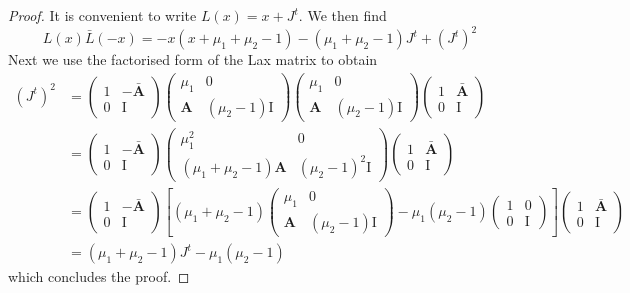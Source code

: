 \documentclass[11pt]{article}
\numberwithin{equation}{section}
\newcommand{\OA}{\mathbf{A}}
\newcommand{\OAD}{\mathbf{\bar{A}}}
\newcommand{\ID}{\mathrm{I}}
\begin{document}
\begin{proof} It is convenient to write $L(x)=x+J^t$. We then find
\begin{equation}
    L(x)\bar L(-x)=-x(x+\mu_1+\mu_2-1)-(\mu_1+\mu_2-1)J^t+(J^t)^2
\end{equation}
Next we use the factorised form of the Lax matrix to obtain
\begin{equation}
\begin{split}
		(J^t)^2&=\left(\begin{array}{cc}
			1&-\OAD\\
			0&\ID
		\end{array}\right)\left(\begin{array}{cc}
			\mu_1&0\\
			\OA&(\mu_2-1)\ID
		\end{array}\right)\left(\begin{array}{cc}
			\mu_1&0\\
			\OA&(\mu_2-1)\ID
		\end{array}\right)\left(\begin{array}{cc}
			1&\OAD\\
			0&\ID
		\end{array}\right)\\
        &=\left(\begin{array}{cc}
			1&-\OAD\\
			0&\ID
		\end{array}\right)\left(\begin{array}{cc}
			\mu_1^2&0\\
			(\mu_1+\mu_2-1)\OA&(\mu_2-1)^2\ID
		\end{array}\right)\left(\begin{array}{cc}
			1&\OAD\\
			0&\ID
		\end{array}\right)\\
        &=\left(\begin{array}{cc}
			1&-\OAD\\
			0&\ID
		\end{array}\right)\left[(\mu_1+\mu_2-1)\left(\begin{array}{cc}
			\mu_1&0\\
			\OA&(\mu_2-1)\ID
		\end{array}\right)-\mu_1(\mu_2-1)\left(\begin{array}{cc}
			1&0\\
			0&\ID
		\end{array}\right)\right]\left(\begin{array}{cc}
			1&\OAD\\
			0&\ID
		\end{array}\right)\\
        &=(\mu_1+\mu_2-1)J^t-\mu_1(\mu_2-1)
        \end{split}
	\end{equation}
    which concludes the proof.
\end{proof} 
\end{document}
